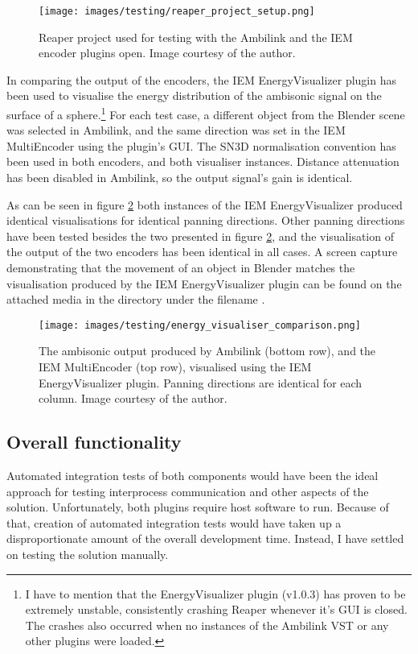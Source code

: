 \begin{figure}
    \centering
    \texttt{[image: images/testing/reaper\_project\_setup.png]}       
    \caption{Reaper project used for testing with the Ambilink and the IEM encoder plugins open. 
    Image courtesy of the author.
        \label{fig:reaper_project}}
\end{figure}

In comparing the output of the encoders, the IEM EnergyVisualizer \cite{iem_plugin_suite} plugin has been used to visualise the
energy distribution of the ambisonic signal on the surface of a sphere.\footnote{
    I have to mention that the EnergyVisualizer plugin (v1.0.3) has proven to be extremely unstable, consistently crashing Reaper 
    whenever it's GUI is closed. The crashes also occurred when no instances of the Ambilink VST or any other plugins were loaded. 
}
For each test case, a different object from the Blender scene was selected in Ambilink, and the same direction was set in the IEM MultiEncoder using the plugin's GUI.
The SN3D normalisation convention has been used in both encoders, and both visualiser instances. 
Distance attenuation has been disabled in Ambilink, so the output signal's gain is identical.

As can be seen in figure \ref{fig:energy_visualiser_cmp} both instances of the IEM EnergyVisualizer produced identical visualisations 
for identical panning directions. Other panning directions have been tested besides the two presented in figure \ref{fig:energy_visualiser_cmp}, 
and the visualisation of the output of the two encoders has been identical in all cases. 
A screen capture demonstrating that the movement of an object in Blender matches the visualisation 
produced by the IEM EnergyVisualizer plugin can be found on the attached media in the  directory
under the filename .

\begin{figure}
    \centering
    \texttt{[image: images/testing/energy\_visualiser\_comparison.png]}       
    \caption{The ambisonic output produced by Ambilink (bottom row), and the IEM MultiEncoder (top row), visualised using the IEM EnergyVisualizer plugin. 
             Panning directions are identical for each column. Image courtesy of the author.
    \label{fig:energy_visualiser_cmp}}
\end{figure}

\subsection{Overall functionality}
Automated integration tests of both components would have been the ideal approach for testing
interprocess communication and other aspects of the solution. 
Unfortunately, both plugins require host software to run. Because of that, creation of automated integration tests would have taken up a 
disproportionate amount of the overall development time. Instead, I have settled on testing the solution manually.

